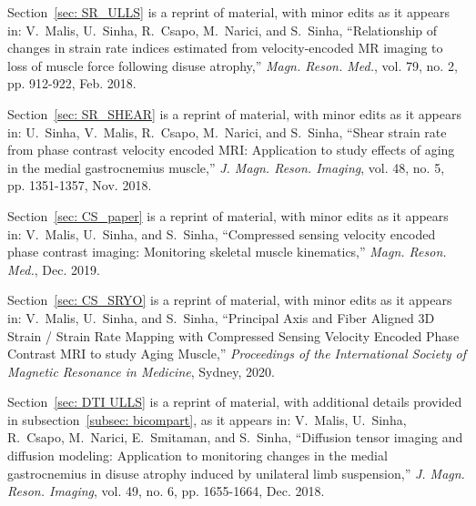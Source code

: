 \begin{frontmatter}
%
\tableofcontents
\listoffigures  %
\listoftables   %



%
%
\begin{acknowledgements}

Section~\ref{sec: SR_ULLS} is a reprint of material, with minor edits as it appears in: V.~Malis, U.~Sinha, R.~Csapo, M.~Narici, and S.~Sinha, ``Relationship of changes in strain rate indices estimated from velocity-encoded MR imaging to loss of muscle force following disuse atrophy,'' \emph{Magn. Reson. Med.}, vol. 79, no. 2, pp. 912-922, Feb. 2018.

Section~\ref{sec: SR_SHEAR} is a reprint of material, with minor edits as it appears in: U.~Sinha, V.~Malis, R.~Csapo, M.~Narici, and S.~Sinha, ``Shear strain rate from phase contrast velocity encoded MRI: Application to study effects of aging in the medial gastrocnemius muscle,'' \emph{J. Magn. Reson. Imaging}, vol. 48, no. 5, pp. 1351-1357, Nov. 2018.

Section~\ref{sec: CS_paper} is a reprint of material, with minor edits as it appears in: V.~Malis, U.~Sinha, and S.~Sinha, ``Compressed sensing velocity encoded phase contrast imaging: Monitoring skeletal muscle kinematics,'' \emph{Magn. Reson. Med.}, Dec. 2019.

Section~\ref{sec: CS_SRYO} is a reprint of material, with minor edits as it appears in: V.~Malis, U.~Sinha, and S.~Sinha, ``Principal Axis and Fiber Aligned 3D Strain / Strain Rate Mapping with Compressed Sensing Velocity Encoded Phase Contrast MRI to study Aging Muscle,'' \emph{Proceedings of the International Society of Magnetic Resonance in Medicine}, Sydney, 2020.

Section~\ref{sec: DTI ULLS} is a reprint of material, with additional details provided in subsection~\ref{subsec: bicompart}, as it appears in: V.~Malis, U.~Sinha, R.~Csapo, M.~Narici, E.~Smitaman, and S.~Sinha, ``Diffusion tensor imaging and diffusion modeling: Application to monitoring changes in the medial gastrocnemius in disuse atrophy induced by unilateral limb suspension,'' \emph{J. Magn. Reson. Imaging}, vol. 49, no. 6, pp. 1655-1664, Dec. 2018.


\end{acknowledgements}
\end{frontmatter}
